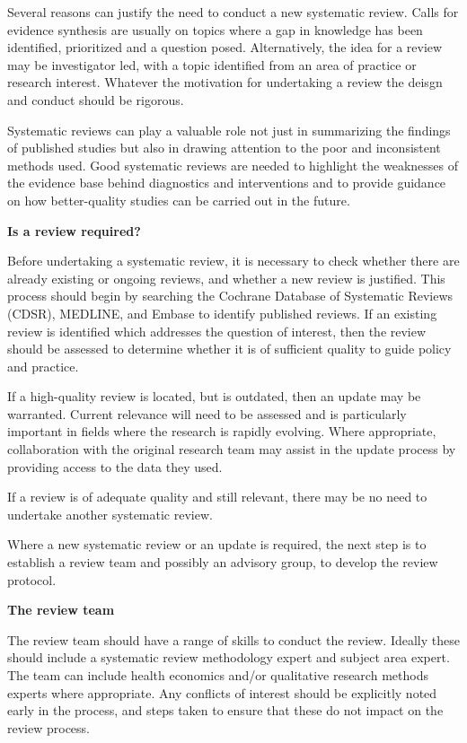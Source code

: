 \documentclass[
  11pt,
  a4paper,
  DIV=11,
  numbers=noendperiod]{scrreprt}
\begin{document}
Several reasons can justify the need to conduct a new systematic review.
Calls for evidence synthesis are usually on topics where a gap in
knowledge has been identified, prioritized and a question posed.
Alternatively, the idea for a review may be investigator led, with a
topic identified from an area of practice or research interest. Whatever
the motivation for undertaking a review the deisgn and conduct should be
rigorous.

Systematic reviews can play a valuable role not just in summarizing the
findings of published studies but also in drawing attention to the poor
and inconsistent methods used. Good systematic reviews are needed to
highlight the weaknesses of the evidence base behind diagnostics and
interventions and to provide guidance on how better-quality studies can
be carried out in the future.

\textbf{Is a review required?}

Before undertaking a systematic review, it is necessary to check whether
there are already existing or ongoing reviews, and whether a new review
is justified. This process should begin by searching the Cochrane
Database of Systematic Reviews (CDSR), MEDLINE, and Embase to identify
published reviews. If an existing review is identified which addresses
the question of interest, then the review should be assessed to
determine whether it is of sufficient quality to guide policy and
practice.

If a high-quality review is located, but is outdated, then an update may
be warranted. Current relevance will need to be assessed and is
particularly important in fields where the research is rapidly evolving.
Where appropriate, collaboration with the original research team may
assist in the update process by providing access to the data they used.

If a review is of adequate quality and still relevant, there may be no
need to undertake another systematic review.

Where a new systematic review or an update is required, the next step is
to establish a review team and possibly an advisory group, to develop
the review protocol.

\textbf{The review team}

The review team should have a range of skills to conduct the review.
Ideally these should include a systematic review methodology expert and
subject area expert. The team can include health economics and/or
qualitative research methods experts where appropriate. Any conflicts of
interest should be explicitly noted early in the process, and steps
taken to ensure that these do not impact on the review process.
\end{document}
